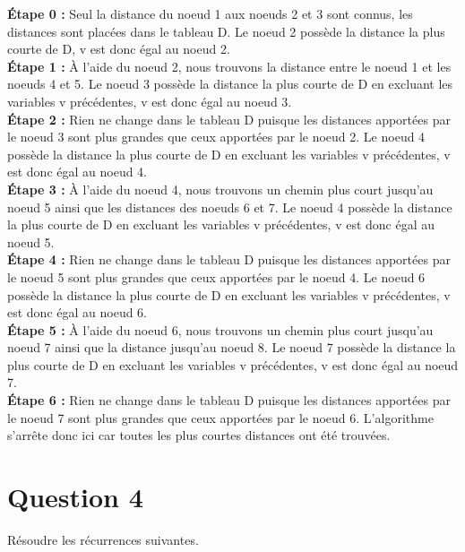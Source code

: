 \documentclass[12pt]{article}
\begin{document}
\textbf{Étape 0 :} Seul la distance du noeud 1 aux noeuds 2 et 3 sont connus, les distances sont placées dans le tableau D. Le noeud 2 possède la distance la plus courte de D, v est donc égal au noeud 2. \\

\textbf{Étape 1 :} À l'aide du noeud 2, nous trouvons la distance entre le noeud 1 et les noeuds 4 et 5. Le noeud 3 possède la distance la plus courte de D en excluant les variables v précédentes, v est donc égal au noeud 3. \\

\textbf{Étape 2 :} Rien ne change dans le tableau D puisque les distances apportées par le noeud 3 sont plus grandes que ceux apportées par le noeud 2. Le noeud 4 possède la distance la plus courte de D en excluant les variables v précédentes, v est donc égal au noeud 4. \\

\textbf{Étape 3 :} À l'aide du noeud 4, nous trouvons un chemin plus court jusqu'au noeud 5 ainsi que les distances des noeuds 6 et 7. Le noeud 4 possède la distance la plus courte de D en excluant les variables v précédentes, v est donc égal au noeud 5. \\

\textbf{Étape 4 :} Rien ne change dans le tableau D puisque les distances apportées par le noeud 5 sont plus grandes que ceux apportées par le noeud 4. Le noeud 6 possède la distance la plus courte de D en excluant les variables v précédentes, v est donc égal au noeud 6. \\

\textbf{Étape 5 :} À l'aide du noeud 6, nous trouvons un chemin plus court jusqu'au noeud 7 ainsi que la distance jusqu'au noeud 8. Le noeud 7 possède la distance la plus courte de D en excluant les variables v précédentes, v est donc égal au noeud 7. \\

\textbf{Étape 6 :} Rien ne change dans le tableau D puisque les distances apportées par le noeud 7 sont plus grandes que ceux apportées par le noeud 6. L'algorithme s'arrête donc ici car toutes les plus courtes distances ont été trouvées. \\

\newpage

\section*{Question 4}
Résoudre les récurrences suivantes. \\
\end{document}
